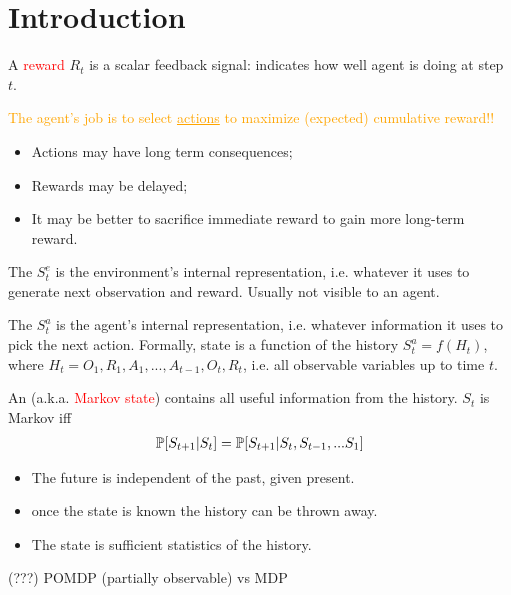 \section{Introduction}

A \textcolor{red}{reward} $R_t$ is a scalar feedback signal: indicates how well agent is doing at step $t$.

\textcolor{orange}{The agent’s job is to select \underline{actions} to maximize (expected) cumulative reward!!}
\begin{itemize}
	\item Actions may have long term consequences;
	\item Rewards may be delayed;
	\item It may be better to sacrifice immediate reward to gain more long-term reward.
\end{itemize}

The  $S^e_t$ is the environment's internal representation, i.e. whatever it uses to generate next observation and reward. Usually not visible to an agent.

The  $S^a_t$ is the agent's internal representation, i.e. whatever information it uses to pick the next action. Formally, state is a function of the history $S^a_t = f(H_t)$, where $H_t = O_1, R_1, A_1, ..., A_{t-1}, O_{t}, R_{t}$, i.e. all observable variables up to time $t$.

An  (a.k.a. \textcolor{red}{Markov state}) contains all useful information from the history. $S_t$ is Markov iff
\begin{align*}
\mathbb{P} [S_{t+1}|S_t]	= \mathbb{P}[S_{t+1}| S_t, S_{t-1}, ... S_1]
\end{align*}
\begin{itemize}
	\item The future is independent of the past, given present.
	\item once the state is known the history can be thrown away.
	\item The state is sufficient statistics of the history.
\end{itemize}


(???) POMDP (partially observable) vs MDP


